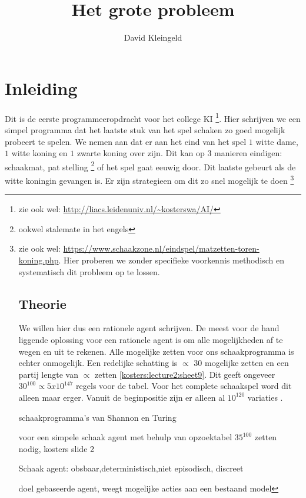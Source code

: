 \documentclass[10pt]{article}
\author{David Kleingeld}
\title{Het grote probleem}
\begin{document}

\maketitle

\section{Inleiding}

Dit is de eerste programmeeropdracht voor het college KI \footnote{zie ook wel: \url{http://liacs.leidenuniv.nl/~kosterswa/AI/}}. Hier schrijven we een simpel programma dat het laatste stuk van het spel schaken zo goed mogelijk probeert te spelen. We nemen aan dat er aan het eind van het spel $1$ witte dame, $1$ witte koning en $1$ zwarte koning over zijn. Dit kan op 3 manieren eindigen: schaakmat, pat stelling \footnote{ookwel stalemate in het engels} of het spel gaat eeuwig door. Dit laatste gebeurt als de witte koningin gevangen is. Er zijn strategieen om dit zo snel mogelijk te doen \footnote{zie ook wel: \url{https://www.schaakzone.nl/eindspel/matzetten-toren-koning.php}. Hier proberen we zonder specifieke voorkennis methodisch en systematisch dit probleem op te lossen.

\section{Theorie}

We willen hier dus een rationele agent schrijven. De meest voor de hand liggende oplossing voor een rationele agent is om alle mogelijkheden af te wegen en uit te rekenen. Alle mogelijke zetten voor ons schaakprogramma is echter onmogelijk. Een redelijke schatting is $\propto$ 30 \cite{Shannon:1988} mogelijke zetten en een partij lengte van $\propto$ zetten \ref{kosters:lecture2:sheet9}. Dit geeft ongeveer $30^100 \propto 5x10^{147}$ regels voor de tabel. Voor het complete schaakspel word dit alleen maar erger. Vanuit de beginpositie zijn er alleen al $10^120$ variaties \cite{Shannon:1988}.

schaakprogramma’s  van  Shannon  en  Turing

voor een simpele schaak agent met behulp van opzoektabel $35^100$ zetten nodig, kosters slide 2

Schaak agent: obsbaar,deterministisch,niet episodisch, discreet

doel gebaseerde agent, weegt mogelijke acties aan een bestaand model

}
\end{document}
